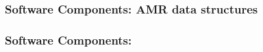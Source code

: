 \begin{frame}[fragile] \frametitle{Software Components: AMR data structures}
\end{frame}
\begin{frame}[fragile] \frametitle{Software Components: }
\end{frame}
